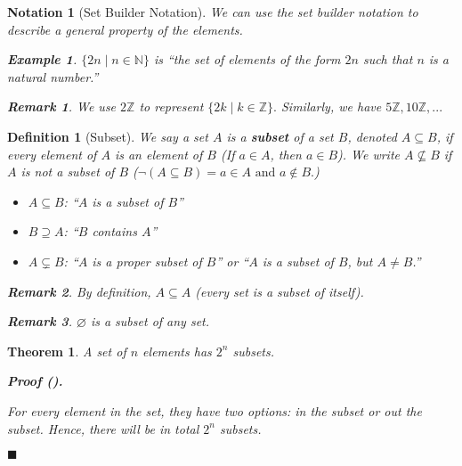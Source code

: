 \documentclass[12pt,a4paper]{article}
\newtheorem{nota}{Notation}[section]
\newtheorem{thm}{Theorem}[subsection]
\newtheorem{df}{Definition}[subsection]
\newtheorem{eg}{Example}[subsection]
\newcounter{nprf}[subsection]
\newtheorem*{rmk}{\indent Remark}
\newenvironment*{prf}{\par\indent\textbf{\textit{Proof} (\stepcounter{nprf}\thenprf). }\par }{\par\hfill $\blacksquare$\par}
\def\Z{{\mathbb{Z}}}
\def\N{{\mathbb{N}}}
\def\emptyset{\varnothing}
\begin{document}
\begin{nota}[Set Builder Notation]
	We can use the set builder notation to describe a general property of the elements.
	\begin{eg}
		$\{2n\mid n\in\N\}$ is ``the set of elements of the form $2n$ such that $n$ is a natural number.''	
	\end{eg}
	\begin{rmk} We use $2\Z$ to represent $\{2k\mid k\in\Z\}.$ Similarly, we have $5\Z, 10\Z,...$\end{rmk}
\end{nota}
\begin{df}[Subset]
	We say a set $A$ is a \textbf{subset} of a set $B$, denoted $A\subseteq B$, if every element of $A$ is an element of $B$ (If $a\in A$, then $a\in B$). We write $A\nsubseteq B$ if $A$ is not a subset of $B$ ($\neg(A\subseteq B)=a\in A\text{ and }a\notin B.$)
	\begin{itemize}
		\item $A\subseteq B$: ``$A$ is a subset of $B$''
		\item $B\supseteq A$: ``$B$ contains $A$''
		\item $A\subsetneq B$: ``$A$ is a proper subset of $B$'' or ``$A$ is a subset of $B$, but $A\neq B$.''
	\end{itemize}
	\begin{rmk}By definition, $A\subseteq A$ (every set is a subset of itself). \end{rmk}
	\begin{rmk}$\emptyset$ is a subset of any set.\end{rmk}
\end{df}
\begin{thm}
	A set of $n$ elements has $2^n$ subsets.
	\begin{prf}
		For every element in the set, they have two options: in the subset or out the subset. Hence, there will be in total $2^n$ subsets.	
	\end{prf}
\end{thm}
\end{document}
